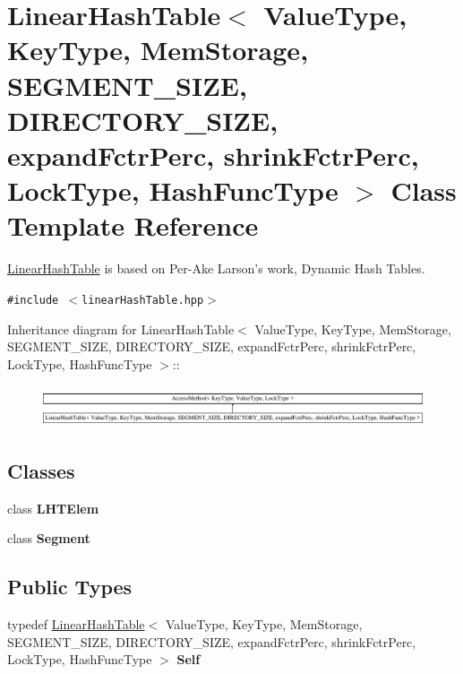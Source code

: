 \hypertarget{classLinearHashTable_3_01ValueType_00_01KeyType_00_01MemStorage_00_01SEGMENT__SIZE_00_01DIRECTORc7a065a47b9854d6d22bcaeeb634c1b3}{
\section{LinearHashTable$<$ ValueType, KeyType, MemStorage, SEGMENT\_\-SIZE, DIRECTORY\_\-SIZE, expandFctrPerc, shrinkFctrPerc, LockType, HashFuncType $>$ Class Template Reference}
\label{classLinearHashTable_3_01ValueType_00_01KeyType_00_01MemStorage_00_01SEGMENT__SIZE_00_01DIRECTORc7a065a47b9854d6d22bcaeeb634c1b3}
}
\hyperlink{classLinearHashTable}{LinearHashTable} is based on Per-Ake Larson's work, Dynamic Hash Tables.  


{\tt \#include $<$linearHashTable.hpp$>$}

Inheritance diagram for LinearHashTable$<$ ValueType, KeyType, MemStorage, SEGMENT\_\-SIZE, DIRECTORY\_\-SIZE, expandFctrPerc, shrinkFctrPerc, LockType, HashFuncType $>$::\begin{figure}[H]
\begin{center}
\leavevmode
\includegraphics[height=1.22942cm]{classLinearHashTable_3_01ValueType_00_01KeyType_00_01MemStorage_00_01SEGMENT__SIZE_00_01DIRECTORc7a065a47b9854d6d22bcaeeb634c1b3}
\end{center}
\end{figure}
\subsection*{Classes}
\begin{CompactItemize}
\item 
class \textbf{LHTElem}
\item 
class \textbf{Segment}
\end{CompactItemize}
\subsection*{Public Types}
\begin{CompactItemize}
\item 
\hypertarget{classLinearHashTable_3_01ValueType_00_01KeyType_00_01MemStorage_00_01SEGMENT__SIZE_00_01DIRECTORc7a065a47b9854d6d22bcaeeb634c1b3_6ecf1f7c35f93e5eeab12afaf45965c6}{
typedef \hyperlink{classLinearHashTable}{LinearHashTable}$<$ ValueType, KeyType, MemStorage, SEGMENT\_\-SIZE, DIRECTORY\_\-SIZE, expandFctrPerc, shrinkFctrPerc, LockType, HashFuncType $>$ \textbf{Self}}
\label{classLinearHashTable_3_01ValueType_00_01KeyType_00_01MemStorage_00_01SEGMENT__SIZE_00_01DIRECTORc7a065a47b9854d6d22bcaeeb634c1b3_6ecf1f7c35f93e5eeab12afaf45965c6}

\end{CompactItemize}
